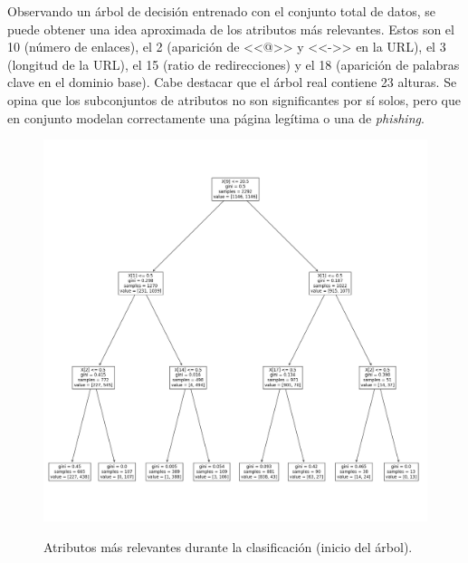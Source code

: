 Observando un árbol de decisión entrenado con el conjunto total de datos, se puede obtener una idea aproximada de los atributos más relevantes. Estos son el 10 (número de enlaces), el 2 (aparición de <<@>> y <<->> en la URL), el 3 (longitud de la URL), el 15 (ratio de redirecciones) y el 18 (aparición de palabras clave en el dominio base). Cabe destacar que el árbol real contiene 23 alturas. Se opina que los subconjuntos de atributos no son significantes por sí solos, pero que en conjunto modelan correctamente una página legítima o una de \textit{phishing}.

\begin{figure}[h]
	\caption[\textit{Phishing}: detección (\texttt{f1-f19}, atributos relevantes)]{Atributos más relevantes durante la clasificación (inicio del árbol).}
	\centering
	\includegraphics[width=\textwidth]{../img/memoria/5_phishing/f1f19_tree}
	\label{gr:ph-f1f19_tree}
\end{figure}


